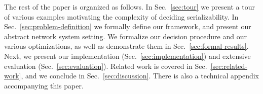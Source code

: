 The rest of the paper is organized as follows. In Sec.~\ref{sec:tour} we present a tour of various examples motivating the complexity of deciding serializability. In Sec.~\ref{sec:problem-definition} we formally define our framework, and present our abstract  network system setting. We formalize our decision procedure and our various optimizations, as well as demonstrate them in Sec.~\ref{sec:formal-results}. Next, we present our implementation (Sec.~\ref{sec:implementation}) and extensive evaluation (Sec.~\ref{sec:evaluation}). 
Related work is covered in Sec.~\ref{sec:related-work}, and we conclude in Sec.~\ref{sec:discussion}.
%
There is also a technical appendix accompanying this paper.





